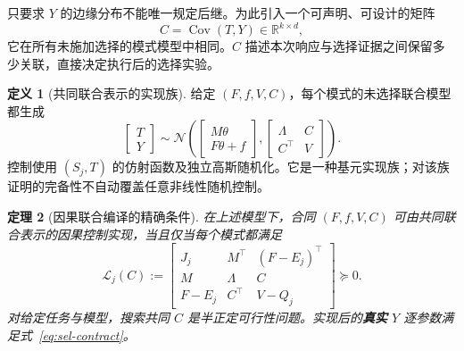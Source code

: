 \documentclass[UTF8,fontset=fandol,11pt,a4paper]{ctexart}
\newcommand{\R}{\mathbb R}
\newcommand{\N}{\mathcal N}
\newcommand{\Cov}{\operatorname{Cov}}
\newtheorem{theorem}{定理}[section]
\theoremstyle{definition}
\newtheorem{definition}[theorem]{定义}
\theoremstyle{remark}
\numberwithin{equation}{section}
\begin{document}
只要求 $Y$ 的边缘分布不能唯一规定后继。为此引入一个可声明、可设计的矩阵
\begin{equation}
 C=\Cov(T,Y)\in\R^{k\times d},
 \label{eq:coupling}
\end{equation}
它在所有未施加选择的模式模型中相同。$C$ 描述本次响应与选择证据之间保留多少关联，直接决定执行后的选择实验。

\begin{definition}[共同联合表示的实现族]
给定 $(F,f,V,C)$，每个模式的未选择联合模型都生成
\begin{equation}
 \begin{bmatrix}T\\Y\end{bmatrix}
 \sim\N\!\left(
 \begin{bmatrix}M\theta\\F\theta+f\end{bmatrix},
 \begin{bmatrix}\Lambda&C\\C^\top&V\end{bmatrix}\right).
 \label{eq:common-joint}
\end{equation}
控制使用 $(S_j,T)$ 的仿射函数及独立高斯随机化。它是一种基元实现族；对该族证明的完备性不自动覆盖任意非线性随机控制。
\end{definition}

\begin{theorem}[因果联合编译的精确条件]
\label{thm:sel-gate}
在上述模型下，合同 $(F,f,V,C)$ 可由共同联合表示的因果控制实现，当且仅当每个模式都满足
\begin{equation}
 \boxed{
 \mathcal L_j(C):=
 \begin{bmatrix}
 J_j&M^\top&(F-E_j)^\top\\
 M&\Lambda&C\\
 F-E_j&C^\top&V-Q_j
 \end{bmatrix}\succeq0.}
 \label{eq:selection-lmi}
\end{equation}
对给定任务与模型，搜索共同 $C$ 是半正定可行性问题。实现后的\textbf{真实} $Y$ 逐参数满足式~\eqref{eq:sel-contract}。
\end{theorem}
\end{document}
